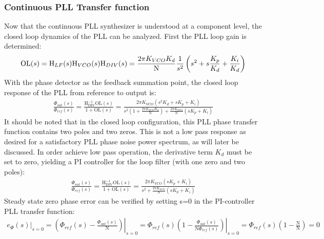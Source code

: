 \subsubsection{Continuous PLL Transfer function}\label{cont_pll_tf}
Now that the continuous PLL synthesizer is understood at a component level, the closed loop dynamics of the PLL can be analyzed. First the PLL loop gain is determined:
\begin{equation}
	\mathrm{OL}(s) = \textnormal{H}_{LF}(s)\textnormal{H}_{VCO}(s)\textnormal{H}_{DIV}(s) = \frac{2\pi K_{VCO}K_d}{\mathrm{N}}\frac{1}{s^2}\left(s^2 + s\frac{K_p}{K_d} + \frac{K_i}{K_d}\right)
\end{equation}
With the phase detector as the feedback summation point, the closed loop response of the PLL from reference to output is:
\begin{align} \label{eq:pid_pll_tf}
	\frac{\Phi_{out}(s)}{\Phi_{ref}(s)} = \frac{\mathrm{H_{DIV}^{-1}OL}(s)}{1 + \mathrm{OL}(s)} = \frac{2\pi K_{VCO}\left(s^2K_d + sK_p + K_i\right)}{s^2\left(1 + \frac{2\pi K_{VCO}K_d}{\mathrm{N}}\right) + \frac{2\pi K_{VCO}}{\mathrm{N}}\left(sK_p + K_i\right)}
\end{align}
It should be noted that in the closed loop configuration, this PLL phase transfer function contains two poles and two zeros. This is not a low pass response as desired for a satisfactory PLL phase noise power spectrum, as will later be discussed. In order achieve low pass operation, the derivative term $K_d$ must be set to zero, yielding a PI controller for the loop filter (with one zero and two poles):
\begin{align} \label{eq:full_pi_pll_tf}
	\frac{\Phi_{out}(s)}{\Phi_{ref}(s)} = \frac{\mathrm{H_{DIV}^{-1}OL}(s)}{1 + \mathrm{OL}(s)} = \frac{2\pi K_{VCO}\left(sK_p + K_i\right)}{s^2 + \frac{2\pi K_{VCO}}{\mathrm{N}}\left(sK_p + K_i\right)}
\end{align}
Steady state zero phase error can be verified by setting s=0 in the PI-controller PLL transfer function:
\begin{align}
	\left.e_\Phi(s)\right\vert_{s=0} = \left.\left(\Phi_{ref}(s) - \frac{\Phi_{out}(s)}{\mathrm{N}}\right)\right\vert_{s=0} = \left.\Phi_{ref}(s)\left(1 - \frac{\Phi_{out}(s)}{\mathrm{N}\Phi_{ref}(s)}\right)\right\vert_{s=0} = \Phi_{ref}(s)\left(1 - \frac{\mathrm{N}}{\mathrm{N}}\right) = 0
\end{align}
